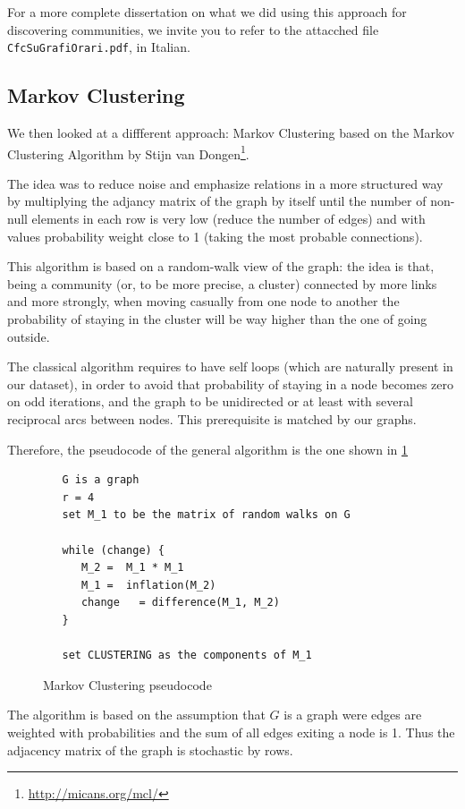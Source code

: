 \documentclass[12pt,a4paper]{article}
\begin{document}
For a more complete dissertation on what we did using this approach for discovering communities, we invite you to refer to the attacched file \texttt{CfcSuGrafiOrari.pdf}, in Italian.

\subsection{Markov Clustering}

We then looked at a diffferent approach: Markov Clustering based on the Markov Clustering Algorithm by Stijn van Dongen\footnote{\url{http://micans.org/mcl/}}.

The idea was to reduce noise and emphasize relations in a more structured way
by multiplying the adjancy matrix of the graph by itself until the number of
non-null elements in each row is very low (reduce the number of edges) and with
values probability weight close to 1 (taking the most probable connections).

This algorithm is based on a random-walk view of the graph: the idea is that, being a community
(or, to be more precise, a cluster) connected by more links and more strongly, when moving
casually from one node to another the probability of staying in the cluster
will be way higher than the one of going outside. 

The classical algorithm requires to have self loops (which are naturally present in our dataset), in order to avoid that probability of staying in a node becomes zero on odd iterations, and the graph to be unidirected or at least with several reciprocal arcs between nodes.
This prerequisite is matched by our graphs.

Therefore, the pseudocode of the general algorithm is the one shown in \ref{fig:mcl}
\begin{figure}[H]
\begin{verbatim}
   G is a graph
   r = 4
   set M_1 to be the matrix of random walks on G

   while (change) {
      M_2 =  M_1 * M_1
      M_1 =  inflation(M_2)
      change   = difference(M_1, M_2)
   }

   set CLUSTERING as the components of M_1
\end{verbatim}
\caption{Markov Clustering pseudocode}
\label{fig:mcl}
\end{figure}

The algorithm is based on the assumption that $G$ is a graph
were edges are weighted with probabilities and the sum
of all edges exiting a node is 1. Thus the adjacency matrix
of the graph is stochastic by rows.
\end{document}
